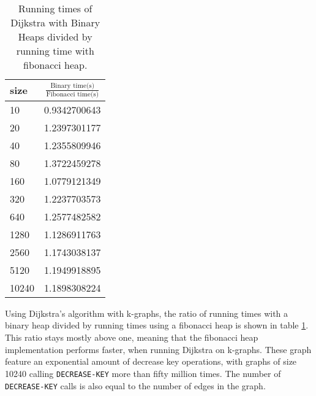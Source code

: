 \documentclass[a4paper,10pt]{article}
\begin{document}
\begin{table}
  \begin{center}
    \begin{tabular}{l|c}
      size & $\frac{\text{Binary time(s)}}{\text{Fibonacci time(s)}}$ \\
      \hline
      10    & 0.9342700643\\
      20    & 1.2397301177\\
      40    & 1.2355809946\\
      80    & 1.3722459278\\
      160   & 1.0779121349\\
      320   & 1.2237703573\\
      640   & 1.2577482582\\
      1280  & 1.1286911763\\
      2560  & 1.1743038137\\
      5120  & 1.1949918895\\
      10240 & 1.1898308224
    \end{tabular}
    \caption{Running times of Dijkstra with Binary Heaps divided by running time with fibonacci heap.}
    \label{run-time-bin-div-fib}
  \end{center}
\end{table}

Using Dijkstra's algorithm with k-graphs, the ratio of running times with a binary heap divided by running times using a fibonacci heap is shown in table \ref{run-time-bin-div-fib}. This ratio stays mostly above one, meaning that the fibonacci heap implementation performs faster, when running Dijkstra on k-graphs. These graph feature an exponential amount of decrease key operations, with graphs of size 10240 calling \texttt{DECREASE\--KEY} more than fifty million times. The number of \texttt{DECREASE\--KEY} calls is also equal to the number of edges in the graph. 
\end{document}
